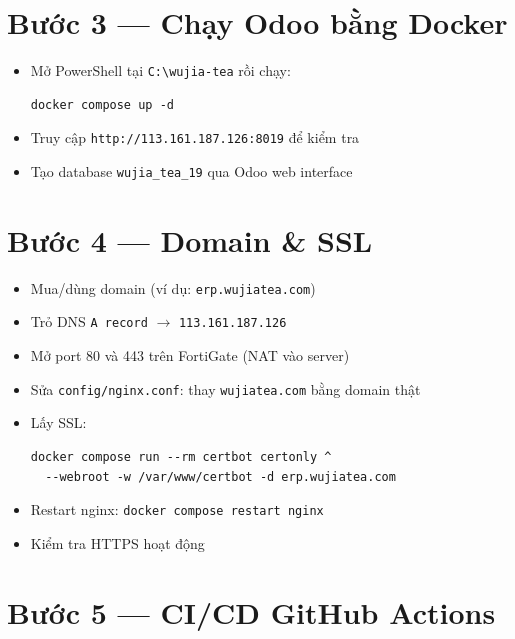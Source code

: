 \documentclass[12pt, a4paper]{article}
\begin{document}
\section{Bước 3 — Chạy Odoo bằng Docker}

\begin{itemize}[label=\Square]
  \item Mở PowerShell tại \texttt{C:\textbackslash wujia-tea} rồi chạy:
\begin{lstlisting}
docker compose up -d
\end{lstlisting}
  \item Truy cập \texttt{http://113.161.187.126:8019} để kiểm tra
  \item Tạo database \texttt{wujia\_tea\_19} qua Odoo web interface
\end{itemize}

\section{Bước 4 — Domain \& SSL}

\begin{itemize}[label=\Square]
  \item Mua/dùng domain (ví dụ: \texttt{erp.wujiatea.com})
  \item Trỏ DNS \texttt{A record} $\to$ \texttt{113.161.187.126}
  \item Mở port 80 và 443 trên FortiGate (NAT vào server)
  \item Sửa \texttt{config/nginx.conf}: thay \texttt{wujiatea.com} bằng domain thật
  \item Lấy SSL:
\begin{lstlisting}
docker compose run --rm certbot certonly ^
  --webroot -w /var/www/certbot -d erp.wujiatea.com
\end{lstlisting}
  \item Restart nginx: \texttt{docker compose restart nginx}
  \item Kiểm tra HTTPS hoạt động
\end{itemize}

\section{Bước 5 — CI/CD GitHub Actions}
\end{document}

